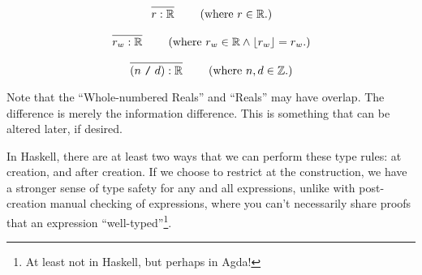 \begin{equation}
      \left.
      \infer{r : \bb{R}}{}
      \right.
      \qquad
      \text{(where \(r \in \bb{R}\).)}
      \label{tr:lit:real}
\end{equation}

\begin{equation}
      \left.
      \infer{r_w : \bb{R}}{}
      \right.
      \qquad
      \text{(where \(r_w \in \bb{R} \land \lfloor{} r_w \rfloor{} = r_w\).)}
      \label{tr:lit:wholeReal}
\end{equation}

\begin{equation}
      \left.
      \infer{(n\ \texttt{/}\ d) : \bb{R}}{}
      \right.
      \qquad
      \text{(where \(n, d \in \bb{Z}\).)}
      \label{tr:lit:fraction}
\end{equation}

Note that the ``Whole-numbered Reals'' and ``Reals'' may have overlap. The
difference is merely the information difference. This is something that can be
altered later, if desired.





In Haskell, there are at least two ways that we can perform these type rules: at
creation, and after creation. If we choose to restrict at the construction, we
have a stronger sense of type safety for any and all expressions, unlike with
post-creation manual checking of expressions, where you can't necessarily share
proofs that an expression ``well-typed''\footnote{At least not in Haskell, but
      perhaps in Agda!}.


